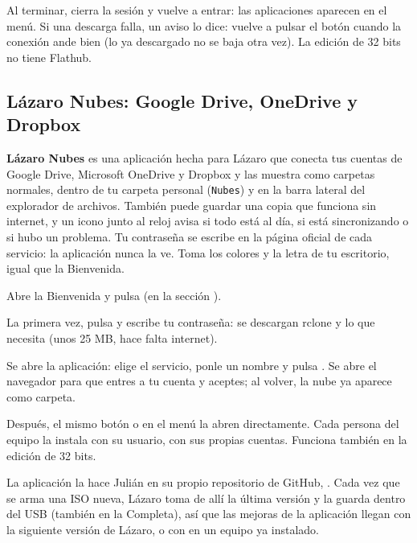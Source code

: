 
Al terminar, cierra la sesión y vuelve a entrar: las aplicaciones
aparecen en el menú. Si una descarga falla, un aviso lo dice: vuelve a
pulsar el botón cuando la conexión ande bien (lo ya descargado no se baja
otra vez). La edición de 32 bits no tiene Flathub.

\subsection{Lázaro Nubes: Google Drive, OneDrive y Dropbox}\label{sec:nubes}
\textbf{Lázaro Nubes} es una aplicación hecha para Lázaro que conecta tus
cuentas de Google Drive, Microsoft OneDrive y Dropbox y las muestra como
carpetas normales, dentro de tu carpeta personal (\texttt{Nubes}) y en la
barra lateral del explorador de archivos. También puede guardar una copia
que funciona sin internet, y un icono junto al reloj avisa si todo está al
día, si está sincronizando o si hubo un problema. Tu contraseña se escribe
en la página oficial de cada servicio: la aplicación nunca la ve. Toma los colores y la letra
de tu escritorio, igual que la Bienvenida.

\begin{pasos}
  \item Abre la Bienvenida y pulsa  (en la sección ).
  \item La primera vez, pulsa  y escribe tu contraseña: se
        descargan rclone y lo que necesita (unos 25 MB, hace falta
        internet).
  \item Se abre la aplicación: elige el servicio, ponle un nombre y pulsa
        . Se abre el navegador para que entres a tu cuenta
        y aceptes; al volver, la nube ya aparece como carpeta.
\end{pasos}


Después, el mismo botón o  en el menú la abren
directamente. Cada persona del equipo la instala con su usuario, con sus
propias cuentas. Funciona también en la edición de 32 bits.

La aplicación la hace Julián en su propio repositorio de GitHub,
. Cada vez que se arma una ISO
nueva, Lázaro toma de allí la última versión y la guarda dentro del USB
(también en la Completa), así que las mejoras de la aplicación llegan con
la siguiente versión de Lázaro, o con  en un equipo ya
instalado.

